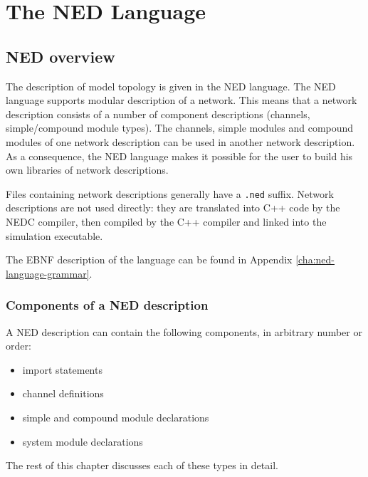 \chapter{The NED Language}
\label{cha:the-ned-language}


\section{NED overview}

The description of model topology is given in the NED
language. The NED language supports modular
description of a network. This means that a network
description consists of a number of
component descriptions (channels,
simple/compound module
types). The channels, simple modules and compound
modules of one network description can be used in another network
description. As a consequence, the NED language makes it possible for
the user to build his own libraries of network descriptions.


Files containing network descriptions generally have a \texttt{.ned}
suffix.  Network descriptions are not used directly: they are
translated into C++ code by the NEDC compiler, then compiled by the
C++ compiler and linked into the simulation executable.


The EBNF description of the language can be found in Appendix
\ref{cha:ned-language-grammar}.





\subsection{Components of a NED description}

A NED description can contain the following components, in arbitrary
number or order:
\begin{itemize}
  \item{import statements}
  \item{channel definitions}
  \item{simple and compound module declarations}
  \item{system module declarations}
\end{itemize}

The rest of this chapter discusses each of these types in detail.





